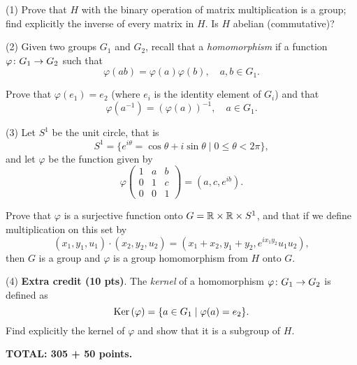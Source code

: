 \documentclass[12pt]{article}
\begin{document}
(1)
Prove that $H$ with the binary operation of matrix multiplication is a group;
find explicitly the inverse of every matrix in $H$.
Is $H$ abelian (commutative)?

\medskip
(2)
Given two groups $G_1$ and $G_2$, recall that a 
{\it homomorphism\/} if a function $\varphi\colon G_1\rightarrow G_2$
such that
\[
\varphi(ab) = \varphi(a)\varphi(b), \quad a, b\in G_1.
\]

Prove that $\varphi(e_1) = e_2$ (where $e_i$ is the identity element
of $G_i$) and that
\[
\varphi(a^{-1}) = (\varphi(a))^{-1}, \quad a\in G_1.
\] 

(3)
Let $S^1$ be the unit circle, that is 
\[
S^1 = \{ e^{i\theta} = \cos\theta + i\sin\theta \mid 0 \leq \theta < 2\pi\},
\]
and let $\varphi$ be the function given by
\[
\varphi \begin{pmatrix}
1 & a & b \\
0 & 1 & c \\
0 & 0 & 1
\end{pmatrix}
 = (a, c, e^{ib}).
\]

Prove that $\varphi$ is a surjective function onto
$G = \mathbb{R}\times\mathbb{R}\times S^1$, and that if we define multiplication
on this set by
\[
(x_1, y_1, u_1)\cdot (x_2, y_2, u_2) = (x_1 + x_2 , y_1 + y_2, 
e^{i x_1y_2} u_1u_2),
\]
then $G$ is a group and 
$\varphi$ is a group homomorphism from $H$ onto $G$.


\medskip
(4) {\bf Extra credit (10 pts)\/}.
The {\it kernel} of a homomorphism $\varphi\colon G_1\rightarrow G_2$
is defined as
\[
{\rm Ker}\,(\varphi) = \{a\in G_1 \mid \varphi(a) = e_2\}. 
\]
Find explicitly the kernel of $\varphi$ and show that
it is a subgroup of $H$.




\vspace{0.5cm}\noindent
{\bf TOTAL: 305 + 50 points.}
\end{document}
